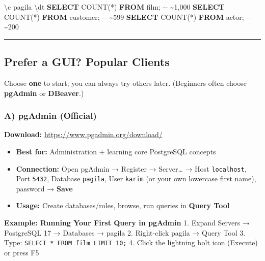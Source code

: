 \documentclass[
  letterpaper,
  DIV=11,
  numbers=noendperiod]{scrartcl}
\newenvironment{Shaded}{\begin{snugshade}}{\end{snugshade}}
\newcommand{\CommentTok}[1]{\textcolor[rgb]{0.37,0.37,0.37}{#1}}
\newcommand{\FunctionTok}[1]{\textcolor[rgb]{0.28,0.35,0.67}{#1}}
\newcommand{\KeywordTok}[1]{\textcolor[rgb]{0.00,0.23,0.31}{\textbf{#1}}}
\newcommand{\NormalTok}[1]{\textcolor[rgb]{0.00,0.23,0.31}{#1}}
\newcommand{\OperatorTok}[1]{\textcolor[rgb]{0.37,0.37,0.37}{#1}}
\providecommand{\tightlist}{%
  \setlength{\itemsep}{0pt}\setlength{\parskip}{0pt}}\usepackage{longtable,booktabs,array}
\begin{document}
\begin{Shaded}
\begin{Highlighting}[]
\NormalTok{\textbackslash{}c pagila}
\NormalTok{\textbackslash{}dt}
\KeywordTok{SELECT} \FunctionTok{COUNT}\NormalTok{(}\OperatorTok{*}\NormalTok{) }\KeywordTok{FROM}\NormalTok{ film;       }\CommentTok{{-}{-} \textasciitilde{}1,000}
\KeywordTok{SELECT} \FunctionTok{COUNT}\NormalTok{(}\OperatorTok{*}\NormalTok{) }\KeywordTok{FROM}\NormalTok{ customer;   }\CommentTok{{-}{-} \textasciitilde{}599}
\KeywordTok{SELECT} \FunctionTok{COUNT}\NormalTok{(}\OperatorTok{*}\NormalTok{) }\KeywordTok{FROM}\NormalTok{ actor;      }\CommentTok{{-}{-} \textasciitilde{}200}
\end{Highlighting}
\end{Shaded}

\begin{center}\rule{0.5\linewidth}{0.5pt}\end{center}

\subsection{Prefer a GUI? Popular
Clients}\label{prefer-a-gui-popular-clients}

Choose \textbf{one} to start; you can always try others later.
(Beginners often choose \textbf{pgAdmin} or \textbf{DBeaver}.)

\subsubsection{A) pgAdmin (Official)}\label{a-pgadmin-official}

\textbf{Download:} \url{https://www.pgadmin.org/download/}

\begin{itemize}
\tightlist
\item
  \textbf{Best for:} Administration + learning core PostgreSQL concepts
\item
  \textbf{Connection:} Open pgAdmin → Register → Server\ldots{} → Host
  \texttt{localhost}, Port \texttt{5432}, Database \texttt{pagila}, User
  \texttt{karim} (or your own lowercase first name), password →
  \textbf{Save}
\item
  \textbf{Usage:} Create databases/roles, browse, run queries in
  \textbf{Query Tool}
\end{itemize}

\textbf{Example: Running Your First Query in pgAdmin} 1. Expand Servers
→ PostgreSQL 17 → Databases → pagila 2. Right-click pagila → Query Tool
3. Type: \texttt{SELECT\ *\ FROM\ film\ LIMIT\ 10;} 4. Click the
lightning bolt icon (Execute) or press F5
\end{document}
